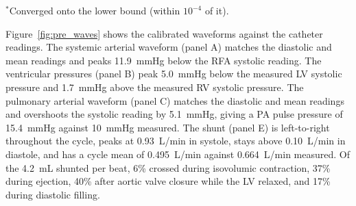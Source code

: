 \documentclass{article}
\begin{document}
\begin{table}[!htbp]
\centering\small
\setlength{\tabcolsep}{4pt}
\caption{The seven calibrated parameters: allometrically scaled value, clinically seeded start, bounds, calibrated value and ratio to the scaled value. Resistance scales are dimensionless multipliers of the scaled compartment resistances.}
\label{tab:bounds}
\par\vspace{2pt}
{\footnotesize $^{\ast}$Converged onto the lower bound (within $10^{-4}$ of it).}
\end{table}

Figure~\ref{fig:pre_waves} shows the calibrated waveforms against the catheter readings. The systemic arterial waveform (panel A) matches the diastolic and mean readings and peaks 11.9~mmHg below the RFA systolic reading. The ventricular pressures (panel B) peak 5.0~mmHg below the measured LV systolic pressure and 1.7~mmHg above the measured RV systolic pressure. The pulmonary arterial waveform (panel C) matches the diastolic and mean readings and overshoots the systolic reading by 5.1~mmHg, giving a PA pulse pressure of 15.4~mmHg against 10~mmHg measured. The shunt (panel E) is left-to-right throughout the cycle, peaks at 0.93~L/min in systole, stays above 0.10~L/min in diastole, and has a cycle mean of 0.495~L/min against 0.664~L/min measured. Of the 4.2~mL shunted per beat, 6\% crossed during isovolumic contraction, 37\% during ejection, 40\% after aortic valve closure while the LV relaxed, and 17\% during diastolic filling.
\end{document}
